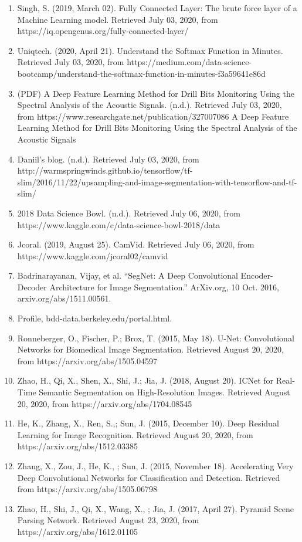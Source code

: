 \documentclass{IEEEtran}
\begin{document}
\begin{enumerate}
\item Singh, S. (2019, March 02). Fully Connected Layer: The brute force layer of a Machine Learning model. Retrieved July 03, 2020, from https://iq.opengenus.org/fully-connected-layer/

\item Uniqtech. (2020, April 21). Understand the Softmax Function in Minutes. Retrieved July 03, 2020, from https://medium.com/data-science-bootcamp/understand-the-softmax-function-in-minutes-f3a59641e86d

\item (PDF) A Deep Feature Learning Method for Drill Bits Monitoring Using the Spectral Analysis of the Acoustic Signals. (n.d.). Retrieved July 03, 2020, from https://www.researchgate.net/publication/327007086 A Deep Feature Learning Method for Drill Bits Monitoring Using the Spectral Analysis of the Acoustic Signals

\item Daniil's blog. (n.d.). Retrieved July 03, 2020, from http://warmspringwinds.github.io/tensorflow/tf-slim/2016/11/22/upsampling-and-image-segmentation-with-tensorflow-and-tf-slim/

\item 2018 Data Science Bowl. (n.d.). Retrieved July 06, 2020, from https://www.kaggle.com/c/data-science-bowl-2018/data

\item Jcoral. (2019, August 25). CamVid. Retrieved July 06, 2020, from https://www.kaggle.com/jcoral02/camvid

\item Badrinarayanan, Vijay, et al. “SegNet: A Deep Convolutional Encoder-Decoder Architecture for Image Segmentation.” ArXiv.org, 10 Oct. 2016, arxiv.org/abs/1511.00561.

\item Profile, bdd-data.berkeley.edu/portal.html.

\item Ronneberger, O., Fischer, P.; Brox, T. (2015, May 18). U-Net: Convolutional Networks for Biomedical Image Segmentation. Retrieved August 20, 2020, from https://arxiv.org/abs/1505.04597

\item Zhao, H., Qi, X., Shen, X., Shi, J.; Jia, J. (2018, August 20). ICNet for Real-Time Semantic Segmentation on High-Resolution Images. Retrieved August 20, 2020, from https://arxiv.org/abs/1704.08545

\item He, K., Zhang, X., Ren, S.,; Sun, J. (2015, December 10). Deep Residual Learning for Image Recognition. Retrieved August 20, 2020, from https://arxiv.org/abs/1512.03385

\item Zhang, X., Zou, J., He, K., ; Sun, J. (2015, November 18). Accelerating Very Deep Convolutional Networks for Classification and Detection. Retrieved from https://arxiv.org/abs/1505.06798

\item Zhao, H., Shi, J., Qi, X., Wang, X., ; Jia, J. (2017, April 27). Pyramid Scene Parsing Network. Retrieved August 23, 2020, from https://arxiv.org/abs/1612.01105
\end{enumerate}
 
\end{document}
